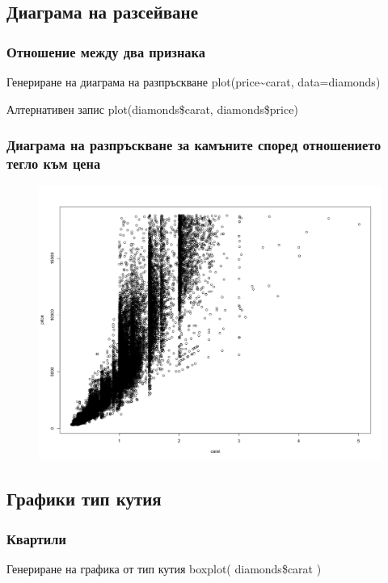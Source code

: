\documentclass{beamer}
\begin{document}
\subsection{Диаграма на разсейване}

\begin{frame}
\frametitle{Отношение между два признака}
\begin{block}{Генериране на диаграма на разпръскване}
plot(price\textasciitilde carat, data=diamonds)
\end{block}

\begin{block}{Алтернативен запис}
plot(diamonds\$carat, diamonds\$price)
\end{block}
\end{frame}

\begin{frame}
\frametitle{Диаграма на разпръскване за камъните според отношението тегло към цена}
\begin{figure}[]\includegraphics[width=\textwidth,height=0.75\textheight]{pic0023}\end{figure}
\end{frame}

\subsection{Графики тип кутия}

\begin{frame}
\frametitle{Квартили}
\begin{block}{Генериране на графика от тип кутия}
boxplot( diamonds\$carat )
\end{block}
\end{frame}
\end{document}
